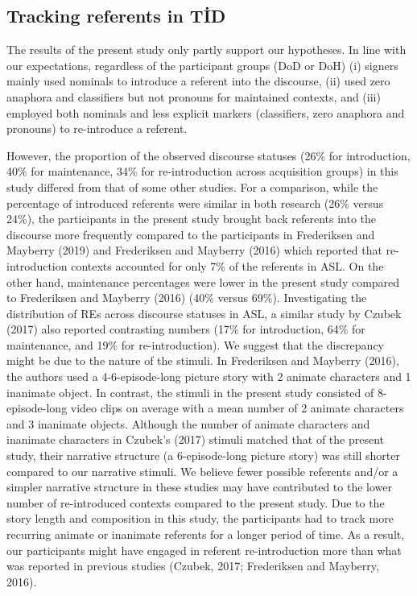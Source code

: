 \documentclass[]{elsarticle} %
\begin{document}
\hypertarget{tracking-referents-in-tid}{%
\subsection{Tracking referents in TİD}\label{tracking-referents-in-tid}}

The results of the present study only partly support our hypotheses. In
line with our expectations, regardless of the participant groups (DoD or
DoH) (i) signers mainly used nominals to introduce a referent into the
discourse, (ii) used zero anaphora and classifiers but not pronouns for
maintained contexts, and (iii) employed both nominals and less explicit
markers (classifiers, zero anaphora and pronouns) to re-introduce a
referent.

However, the proportion of the observed discourse statuses (26\% for
introduction, 40\% for maintenance, 34\% for re-introduction across
acquisition groups) in this study differed from that of some other
studies. For a comparison, while the percentage of introduced referents
were similar in both research (26\% versus 24\%), the participants in
the present study brought back referents into the discourse more
frequently compared to the participants in Frederiksen and Mayberry
(2019) and Frederiksen and Mayberry (2016) which reported that
re-introduction contexts accounted for only 7\% of the referents in ASL.
On the other hand, maintenance percentages were lower in the present
study compared to Frederiksen and Mayberry (2016) (40\% versus 69\%).
Investigating the distribution of REs across discourse statuses in ASL,
a similar study by Czubek (2017) also reported contrasting numbers (17\%
for introduction, 64\% for maintenance, and 19\% for re-introduction).
We suggest that the discrepancy might be due to the nature of the
stimuli. In Frederiksen and Mayberry (2016), the authors used a
4-6-episode-long picture story with 2 animate characters and 1 inanimate
object. In contrast, the stimuli in the present study consisted of
8-episode-long video clips on average with a mean number of 2 animate
characters and 3 inanimate objects. Although the number of animate
characters and inanimate characters in Czubek's (2017) stimuli matched
that of the present study, their narrative structure (a 6-episode-long
picture story) was still shorter compared to our narrative stimuli. We
believe fewer possible referents and/or a simpler narrative structure in
these studies may have contributed to the lower number of re-introduced
contexts compared to the present study. Due to the story length and
composition in this study, the participants had to track more recurring
animate or inanimate referents for a longer period of time. As a result,
our participants might have engaged in referent re-introduction more
than what was reported in previous studies (Czubek, 2017; Frederiksen
and Mayberry, 2016).
\end{document}
